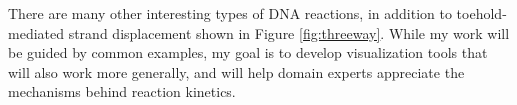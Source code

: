 \documentclass{article}
\begin{document}
There are many other interesting types of DNA reactions, in addition to toehold-mediated strand displacement shown in Figure \ref{fig:threeway}. While my work will be guided by common examples, my goal is to develop visualization tools that will also work more generally, and will help domain experts appreciate the mechanisms behind reaction kinetics.

\end{document}
